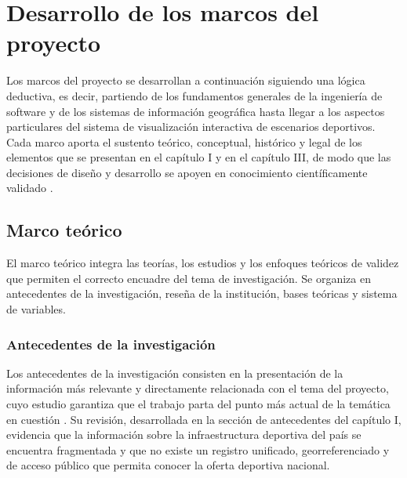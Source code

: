 
\section{Desarrollo de los marcos del proyecto}

Los marcos del proyecto se desarrollan a continuaci\'on siguiendo una l\'ogica
deductiva, es decir, partiendo de los fundamentos generales de la ingenier\'ia
de software y de los sistemas de informaci\'on geogr\'afica hasta llegar a los
aspectos particulares del sistema de visualizaci\'on interactiva de escenarios
deportivos. Cada marco aporta el sustento te\'orico, conceptual, hist\'orico y
legal de los elementos que se presentan en el cap\'itulo I y en el cap\'itulo
III, de modo que las decisiones de dise\~no y desarrollo se apoyen en
conocimiento cient\'ificamente validado \citep{arias2012, hernandez2014}.

\subsection{Marco te\'orico}

El marco te\'orico integra las teor\'ias, los estudios y los enfoques
te\'oricos de validez que permiten el correcto encuadre del tema de
investigaci\'on. Se organiza en antecedentes de la investigaci\'on, rese\~na de
la instituci\'on, bases te\'oricas y sistema de variables.

\subsubsection{Antecedentes de la investigaci\'on}

Los antecedentes de la investigaci\'on consisten en la presentaci\'on de la
informaci\'on m\'as relevante y directamente relacionada con el tema del
proyecto, cuyo estudio garantiza que el trabajo parta del punto m\'as actual de
la tem\'atica en cuesti\'on \citep{arias2012}. Su revisi\'on, desarrollada en la
secci\'on de antecedentes del cap\'itulo I, evidencia que la informaci\'on sobre
la infraestructura deportiva del pa\'is se encuentra fragmentada y que no
existe un registro unificado, georreferenciado y de acceso p\'ublico que
permita conocer la oferta deportiva nacional.

